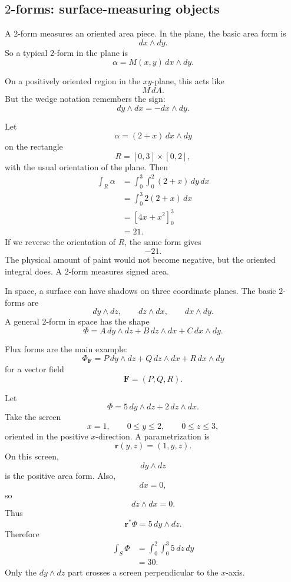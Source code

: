 \subsection{\texorpdfstring{\(2\)}{2}-forms: surface-measuring objects}

A \(2\)-form measures an oriented area piece.  In the plane, the basic area form is
\[
    dx\wedge dy.
\]
So a typical \(2\)-form in the plane is
\[
    \alpha=M(x,y)\,dx\wedge dy.
\]

On a positively oriented region in the \(xy\)-plane, this acts like
\[
    M\,dA.
\]
But the wedge notation remembers the sign:
\[
    dy\wedge dx=-dx\wedge dy.
\]

\begin{example}
Let
\[
    \alpha=(2+x)\,dx\wedge dy
\]
on the rectangle
\[
    R=[0,3]\times[0,2],
\]
with the usual orientation of the plane.  Then
\[
\begin{aligned}
    \int_R \alpha
    &=
    \int_0^3\int_0^2 (2+x)\,dy\,dx\\
    &=
    \int_0^3 2(2+x)\,dx\\
    &=
    \left[4x+x^2\right]_0^3\\
    &=
    21.
\end{aligned}
\]
If we reverse the orientation of \(R\), the same form gives
\[
    -21.
\]
The physical amount of paint would not become negative, but the oriented integral
does.  A \(2\)-form measures signed area.
\end{example}

In space, a surface can have shadows on three coordinate planes.  The basic \(2\)-forms
are
\[
    dy\wedge dz,\qquad dz\wedge dx,\qquad dx\wedge dy.
\]
A general \(2\)-form in space has the shape
\[
    \Phi=A\,dy\wedge dz+B\,dz\wedge dx+C\,dx\wedge dy.
\]

Flux forms are the main example:
\[
    \Phi_{\mathbf F}
    =
    P\,dy\wedge dz
    +
    Q\,dz\wedge dx
    +
    R\,dx\wedge dy
\]
for a vector field
\[
    \mathbf F=(P,Q,R).
\]

\begin{example}
Let
\[
    \Phi=5\,dy\wedge dz+2\,dz\wedge dx.
\]
Take the screen
\[
    x=1,
    \qquad
    0\le y\le2,
    \qquad
    0\le z\le3,
\]
oriented in the positive \(x\)-direction.  A parametrization is
\[
    \mathbf r(y,z)=(1,y,z).
\]
On this screen,
\[
    dy\wedge dz
\]
is the positive area form.  Also,
\[
    dx=0,
\]
so
\[
    dz\wedge dx=0.
\]
Thus
\[
    \mathbf r^*\Phi=5\,dy\wedge dz.
\]
Therefore
\[
\begin{aligned}
    \int_S \Phi
    &=
    \int_0^2\int_0^3 5\,dz\,dy\\
    &=
    30.
\end{aligned}
\]
Only the \(dy\wedge dz\) part crosses a screen perpendicular to the \(x\)-axis.
\end{example}

